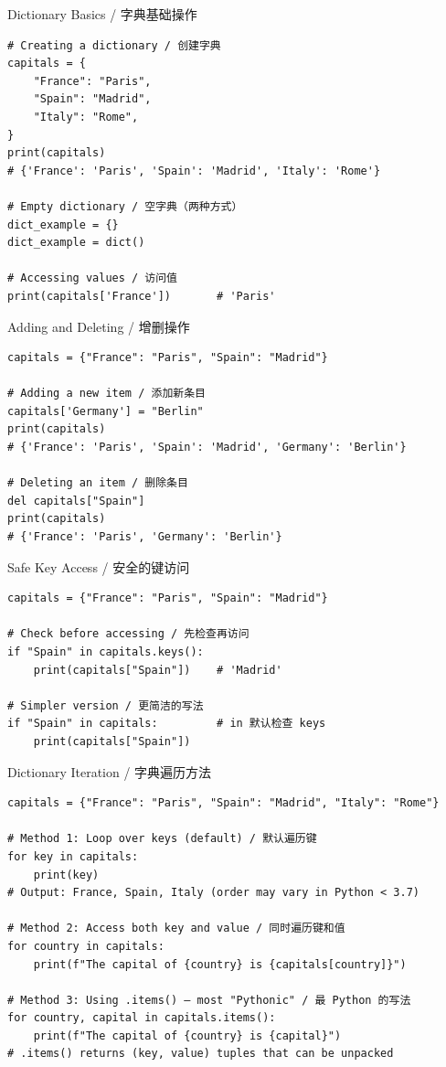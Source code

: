 \documentclass[11pt,a4paper]{report}
\begin{document}
\begin{examplebox}{Dictionary Basics / 字典基础操作}
\begin{lstlisting}
# Creating a dictionary / 创建字典
capitals = {
    "France": "Paris",
    "Spain": "Madrid",
    "Italy": "Rome",
}
print(capitals)
# {'France': 'Paris', 'Spain': 'Madrid', 'Italy': 'Rome'}

# Empty dictionary / 空字典（两种方式）
dict_example = {}
dict_example = dict()

# Accessing values / 访问值
print(capitals['France'])       # 'Paris'
\end{lstlisting}
\end{examplebox}

\begin{examplebox}{Adding and Deleting / 增删操作}
\begin{lstlisting}
capitals = {"France": "Paris", "Spain": "Madrid"}

# Adding a new item / 添加新条目
capitals['Germany'] = "Berlin"
print(capitals)
# {'France': 'Paris', 'Spain': 'Madrid', 'Germany': 'Berlin'}

# Deleting an item / 删除条目
del capitals["Spain"]
print(capitals)
# {'France': 'Paris', 'Germany': 'Berlin'}
\end{lstlisting}
\end{examplebox}

\begin{examplebox}{Safe Key Access / 安全的键访问}
\begin{lstlisting}
capitals = {"France": "Paris", "Spain": "Madrid"}

# Check before accessing / 先检查再访问
if "Spain" in capitals.keys():
    print(capitals["Spain"])    # 'Madrid'

# Simpler version / 更简洁的写法
if "Spain" in capitals:         # in 默认检查 keys
    print(capitals["Spain"])
\end{lstlisting}
\end{examplebox}

\begin{examplebox}{Dictionary Iteration / 字典遍历方法}
\begin{lstlisting}
capitals = {"France": "Paris", "Spain": "Madrid", "Italy": "Rome"}

# Method 1: Loop over keys (default) / 默认遍历键
for key in capitals:
    print(key)
# Output: France, Spain, Italy (order may vary in Python < 3.7)

# Method 2: Access both key and value / 同时遍历键和值
for country in capitals:
    print(f"The capital of {country} is {capitals[country]}")

# Method 3: Using .items() — most "Pythonic" / 最 Python 的写法
for country, capital in capitals.items():
    print(f"The capital of {country} is {capital}")
# .items() returns (key, value) tuples that can be unpacked
\end{lstlisting}
\end{examplebox}
\end{document}
